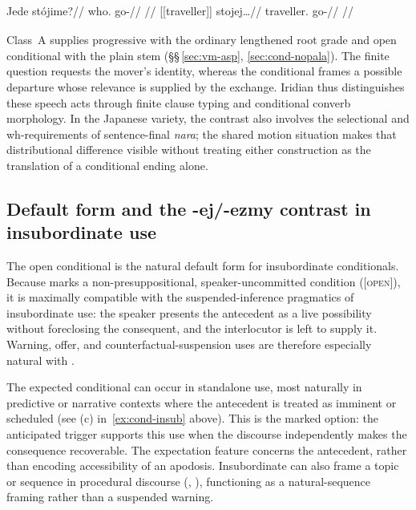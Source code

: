 \pex\label{ex:iridian-motion-question-condition}
\a
\begingl
\gla Jede stójime?//
\glb who.\Dir{} go-\Prog{}//
\glft {}
//
\endgl
\a
\begingl
\gla \textnormal{[[traveller]]}\textsubscript{\Dir{}} stojej\ldots//
\glb traveller.\Dir{} go-\Cond{}//
\glft {}
//
\endgl
\xe

Class~A  supplies progressive  with the
ordinary lengthened root grade and open conditional  with
the plain stem (§§\,\ref{sec:vm-asp}, \ref{sec:cond-nopala}).
The finite question requests the mover's identity, whereas the conditional
frames a possible departure whose relevance is supplied by the exchange.
Iridian thus distinguishes these speech acts through finite clause typing
and conditional converb morphology. In the Japanese variety, the contrast
also involves the selectional and wh-requirements of sentence-final
\textit{nara}; the shared motion situation makes that distributional
difference visible without treating either construction as the translation
of a conditional ending alone.

\subsection{Default form and the -ej/-ezmy contrast in insubordinate use}

The open conditional  is the natural default form for insubordinate
conditionals. Because  marks a non-presuppositional,
speaker-uncommitted condition ([\textsc{open}]), it is maximally compatible with
the suspended-inference pragmatics of insubordinate use: the speaker presents
the antecedent as a live possibility without foreclosing the consequent, and the
interlocutor is left to supply it. Warning, offer, and counterfactual-suspension
uses are therefore especially natural with .

The expected conditional  can occur in standalone use, most naturally
in predictive or narrative contexts where the antecedent is treated as imminent
or scheduled (see (c) in~\ref{ex:cond-insub} above). This is the marked option:
the anticipated trigger supports this use when the discourse independently
makes the consequence recoverable. The expectation feature concerns the
antecedent, rather than encoding accessibility of an apodosis. Insubordinate
 can also
frame a topic or sequence in procedural discourse (, ), functioning as a
natural-sequence framing rather than a suspended warning.

